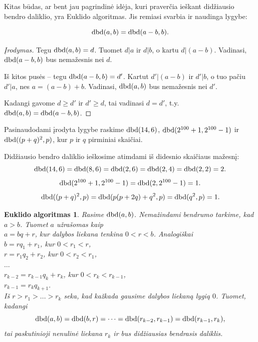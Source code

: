 Kitas būdas, ar bent jau pagrindinė idėja, kuri praverčia ieškant
didžiausio bendro daliklio, yra Euklido algoritmas. Jis remiasi svarbia ir
naudinga lygybe:
\begin{teig}
  $$\operatorname{dbd}(a,b) = \operatorname{dbd}(a-b,b).$$
\end{teig}

\begin{proof}[Įrodymas]
Tegu $\operatorname{dbd}(a,b)=d$. Tuomet $d|a$ ir $d|b$, o kartu $d|(a-b)$. Vadinasi,
$\operatorname{dbd}(a-b,b)$ bus nemažesnis nei $d$.  

Iš kitos pusės -- tegu $\operatorname{dbd}(a-b,b) = d'$. Kartut $d'|(a-b)$ ir $d'|b$, o
tuo pačiu $d'|a$, nes $a = (a-b) + b$.  Vadinasi, $\operatorname{dbd}(a,b)$ bus nemažesnis
nei $d'$. 

Kadangi gavome $d\geq d'$ ir $d' \geq d$, tai vadinasi $d=d'$, t.y.
$\operatorname{dbd}(a,b) = \operatorname{dbd}(a-b,b)$.
\end{proof}

\begin{pav}
  Pasinaudodami įrodyta lygybe raskime $\operatorname{dbd}(14,6)$,
  $\operatorname{dbd}(2^{100}+1, 2^{100}-1)$ ir $\operatorname{dbd}( (p+q)^2, p)$, kur $p$ ir
  $q$ pirminiai skaičiai. 
\end{pav}

\begin{sprendimas}
Didžiausio bendro daliklio ieškosime atimdami iš didesnio skaičiaus
mažesnį:
$$\operatorname{dbd}(14,6) = \operatorname{dbd}(8,6) = \operatorname{dbd}(2,6) = \operatorname{dbd}(2,4) = \operatorname{dbd}(2,2)= 2.$$
$$\operatorname{dbd}(2^{100} + 1, 2^{100} - 1) = \operatorname{dbd}(2,2^{100}-1) = 1.$$
$$\operatorname{dbd}( (p+q)^2, p) = \operatorname{dbd}(p(p + 2q) + q^2, p) = \operatorname{dbd}(q^2 , p) = 1.$$
\end{sprendimas}

\theoremstyle{plain}\newtheorem*{euklidoalg}{Euklido algoritmas}
\begin{euklidoalg} Rasime $\operatorname{dbd}(a,b)$. Nemažindami bendrumo tarkime, kad $a > b$. Tuomet $a$
užrašomas kaip \\
$a = bq + r$, kur dalybos liekana tenkina $0 < r < b$. Analogiškai \\
$b = rq_{1} + r_{1}$, kur $0 < r_{1} < r$, \\
$r = r_{1}q_{2} + r_{2}$, kur $0 < r_{2} < r_{1}$, \\
$\hdots$ \\
$r_{k-2} = r_{k-1}q_{k} + r_{k}$, kur $0 < r_{k} < r_{k-1}$,
\\
$r_{k-1} = r_{k}q_{k+1}.$ \\

Iš $r > r_{1} > ... > r_{k}$ seka, kad kažkada gausime dalybos liekaną
lygią $0$. Tuomet, kadangi $$\operatorname{dbd}(a,b) = \operatorname{dbd}(b,r) = \cdots =
\operatorname{dbd}(r_{k-2},r_{k-1}) = \operatorname{dbd}(r_{k-1},r_{k}),$$ tai paskutinioji nenulinė
liekana $r_{k}$ ir bus didžiausias bendrasis daliklis.
\end{euklidoalg}

